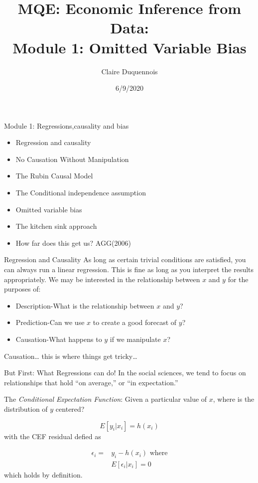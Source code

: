 \documentclass[
  ignorenonframetext,
]{beamer}
\title{MQE: Economic Inference from Data:\\
Module 1: Omitted Variable Bias}
\author{Claire Duquennois}
\date{6/9/2020}
\begin{document}
\frame{\titlepage}

\begin{frame}{Module 1: Regressions,causality and bias}
\protect\hypertarget{module-1-regressionscausality-and-bias}{}
\begin{itemize}
\item
  Regression and causality
\item
  No Causation Without Manipulation
\item
  The Rubin Causal Model
\item
  The Conditional independence assumption
\item
  Omitted variable bias
\item
  The kitchen sink approach
\item
  How far does this get us? AGG(2006)
\end{itemize}
\end{frame}

\begin{frame}{Regression and Causality}
\protect\hypertarget{regression-and-causality}{}
As long as certain trivial conditions are satisfied, you can always run
a linear regression. This is fine as long as you interpret the results
appropriately. We may be interested in the relationship between \(x\)
and \(y\) for the purposes of:

\begin{itemize}
\item
  Description-What is the relationship between \(x\) and \(y\)?
\item
  Prediction-Can we use \(x\) to create a good forecast of \(y\)?
\item
  Causation-What happens to \(y\) if we manipulate \(x\)?
\end{itemize}

Causation\ldots{} this is where things get tricky\ldots{}
\end{frame}

\begin{frame}{But First: What Regressions can do!}
\protect\hypertarget{but-first-what-regressions-can-do}{}
In the social sciences, we tend to focus on relationships that hold ``on
average,'' or ``in expectation.''

The \emph{Conditional Expectation Function}: Given a particular value of
\(x\), where is the distribution of \(y\) centered?

\[
E[y_i|x_i]=h(x_i)
\] with the CEF residual defied as

\[
\begin{aligned}
\epsilon_i = &y_i-h(x_i) \text{ where}\\ 
& E[\epsilon_i|x_i]=0
\end{aligned}
\] which holds by definition.
\end{frame}
\end{document}
